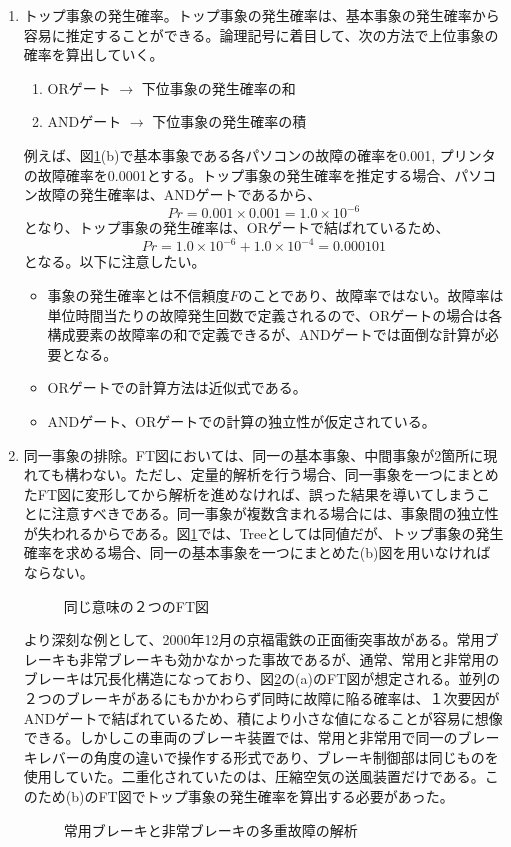 \begin{enumerate}
\item トップ事象の発生確率。トップ事象の発生確率は、基本事象の発生確率から容易に推定することができる。論理記号に着目して、次の方法で上位事象の確率を算出していく。
\begin{enumerate}
\item ORゲート $\to$ 下位事象の発生確率の和
\item ANDゲート $\to$ 下位事象の発生確率の積
\end{enumerate}
例えば、図\ref{420}(b)で基本事象である各パソコンの故障の確率を0.001, プリンタの故障確率を0.0001とする。トップ事象の発生確率を推定する場合、パソコン故障の発生確率は、ANDゲートであるから、
\[Pr = 0.001 \times 0.001 = 1.0 \times 10 ^{-6}\]となり、トップ事象の発生確率は、ORゲートで結ばれているため、
\[Pr = 1.0 \times 10 ^{-6} + 1.0 \times 10^{-4} = 0.000101\]
となる。以下に注意したい。
\begin{itemize}
\item 事象の発生確率とは不信頼度$F$のことであり、故障率ではない。故障率は単位時間当たりの故障発生回数で定義されるので、ORゲートの場合は各構成要素の故障率の和で定義できるが、ANDゲートでは面倒な計算が必要となる。
\item ORゲートでの計算方法は近似式である。
\item ANDゲート、ORゲートでの計算の独立性が仮定されている。
\end{itemize}
\item 同一事象の排除。FT図においては、同一の基本事象、中間事象が2箇所に現れても構わない。ただし、定量的解析を行う場合、同一事象を一つにまとめたFT図に変形してから解析を進めなければ、誤った結果を導いてしまうことに注意すべきである。同一事象が複数含まれる場合には、事象間の独立性が失われるからである。図\ref{420}では、Treeとしては同値だが、トップ事象の発生確率を求める場合、同一の基本事象を一つにまとめた(b)図を用いなければならない。
\begin{figure}[htbp]
\begin{center}
\end{center}
\caption{同じ意味の２つのFT図}
\label{420}
\end{figure}
より深刻な例として、2000年12月の京福電鉄の正面衝突事故がある。常用ブレーキも非常ブレーキも効かなかった事故であるが、通常、常用と非常用のブレーキは冗長化構造になっており、図\ref{421}の(a)のFT図が想定される。並列の２つのブレーキがあるにもかかわらず同時に故障に陥る確率は、１次要因がANDゲートで結ばれているため、積により小さな値になることが容易に想像できる。しかしこの車両のブレーキ装置では、常用と非常用で同一のブレーキレバーの角度の違いで操作する形式であり、ブレーキ制御部は同じものを使用していた。二重化されていたのは、圧縮空気の送風装置だけである。このため(b)のFT図でトップ事象の発生確率を算出する必要があった。
\begin{figure}[htbp]
\begin{center}
\end{center}
\caption{常用ブレーキと非常ブレーキの多重故障の解析}
\label{421}
\end{figure}


\end{enumerate}
